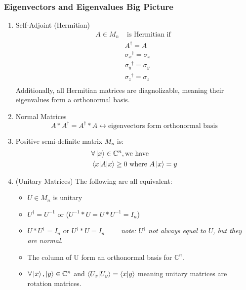 \documentclass[12pt]{article}
\theoremstyle{plain}
\theoremstyle{nonumberplain}
\theoremstyle{plain}
\theoremstyle{nonumberplain}
\newcommand\1{{\bf 1}}
\newcommand{\C}{\mathbb{C}} %
\newcommand{\<}{\left\langle}
\renewcommand{\>}{\right\rangle}
\begin{document}
\subsubsection{Eigenvectors and Eigenvalues Big Picture}
\begin{enumerate}
\item Self-Adjoint (Hermitian)
\begin{equation}
\begin{split}
A \in M_n &\text{ is Hermitian if }\\
&A^\dagger = A\\
&{\sigma_x}^\dagger = \sigma_x\\
&{\sigma_y}^\dagger = \sigma_y\\
&{\sigma_z}^\dagger = \sigma_z\\
\end{split}
\end{equation}
Additionally, all Hermitian matrices are diagnolizable, meaning their eigenvalues form a orthonormal basis.
\item Normal Matrices
\begin{equation}
A*A^\dagger = A^\dagger*A \leftrightarrow \text{eigenvectors form orthonormal basis}
\end{equation}
\item Positive semi-definite matrix $M_n$ is:
\begin{equation}
\begin{split}
&\forall\ket{x} \in \C^n, \text{we have} \\
&\braket{x|A|x} \geq 0 \text{ where } A\ket{x} = y\\
\end{split}
\end{equation}
\item (Unitary Matrices) The following are all equivalent:
\begin{itemize}
\item $U \in M_n$ is unitary
\item $U^\dagger = U^{-1}$ or ($U^{-1}*U = U*U^{-1} = I_n$)
\item $U*U^\dagger = I_n$ or $U^\dagger*U = I_n\qquad$ \textit{note: $U^\dagger$ not always equal to $U$, but they are normal.}  
\item The column of U form an orthonormal basis for $\C^n$.
\item $\forall\ket{x},\ket{y}\in\C^n$ and $\braket{U_x|U_y} = \braket{x|y}$ meaning unitary matrices are rotation matrices.
\end{itemize}
\end{enumerate}
\end{document}
